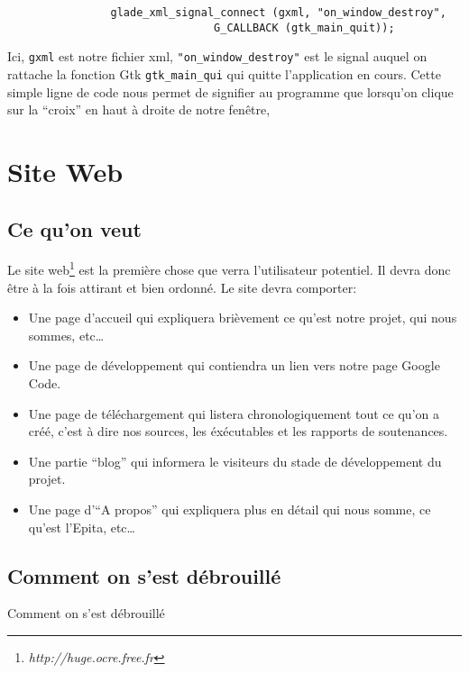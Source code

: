 \documentclass[]{report}
\begin{document}
			\begin{verbatim}
				glade_xml_signal_connect (gxml, "on_window_destroy",
							    G_CALLBACK (gtk_main_quit));
			\end{verbatim}

			Ici, \verb!gxml! est notre fichier xml, \verb!"on_window_destroy"! est le signal auquel on rattache la fonction Gtk \verb!gtk_main_qui! qui quitte l'application en cours. Cette simple ligne de code nous permet de signifier au programme que lorsqu'on clique sur la ``croix'' en haut \`a droite de notre fen\^etre,





	\chapter{Site Web} %
	\label{cha:site_web}
		\section{Ce qu'on veut} %
		\label{sec:ce_qu_on_veut}
		Le site web\footnote{\emph{http://huge.ocre.free.fr}} est la premi\`ere chose que verra l'utilisateur potentiel. Il devra donc \^etre \`a la fois attirant et bien ordonn\'e. Le site devra comporter:
		\begin{itemize}
			\item Une page d'accueil qui expliquera bri\`evement ce qu'est notre projet, qui nous sommes, etc\ldots
			\item Une page de d\'eveloppement qui contiendra un lien vers notre page Google Code.
			\item Une page de t\'el\'echargement qui listera chronologiquement tout ce qu'on a cr\'e\'e, c'est \`a dire nos sources, les \'ex\'ecutables et les rapports de soutenances.
			\item Une partie ``blog'' qui informera le visiteurs du stade de d\'eveloppement du projet.
			\item Une page d'``A propos'' qui expliquera plus en d\'etail qui nous somme, ce qu'est l'Epita, etc\ldots
		\end{itemize}
		\section{Comment on s'est d\'ebrouill\'e} %
		\label{sec:comment_on_s_est_d'ebrouill'e}
		Comment on s'est débrouillé
\end{document}
